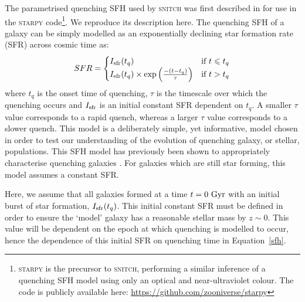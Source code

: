 \documentclass[useAMS,usenatbib]{mn2e}
\begin{document}
The parametrised quenching SFH used by \textsc{snitch} was first described in \cite{smethurst15} for use in the \textsc{starpy} code\footnote{\textsc{starpy} is the precursor to \textsc{snitch}, performing a similar inference of a quenching SFH model using only an optical and near-ultraviolet colour. The code is publicly available here: \url{https://github.com/zooniverse/starpy}}. We reproduce its description here. The quenching SFH of a galaxy can be simply modelled as an exponentially declining star formation rate (SFR) across cosmic time as:
\begin{equation}\label{sfh}
SFR =
\begin{cases}
I_{\rm{sfr}}(t_q) & \text{if } t \leq t_q \\
I_{\rm{sfr}}(t_q) \times \exp{\left( \frac{-(t-t_{q})}{\tau}\right)} & \text{if } t > t_q 
\end{cases}
\end{equation}
where $t_{q}$ is the onset time of quenching, $\tau$ is the timescale over which the quenching occurs and $I_{\rm{sfr}}$ is an initial constant SFR dependent on $t_q$.  A smaller $\tau$ value corresponds to a rapid quench, whereas a larger $\tau$ value corresponds to a slower quench. This model is a deliberately simple, yet informative, model chosen in order to test our understanding of the evolution of quenching galaxy, or stellar, populations. This SFH model has previously been shown to appropriately characterise quenching galaxies \citep{weiner06, martin07, noeske07,schawinski14, smethurst15}. For galaxies which are still star forming, this model assumes a constant SFR.



Here, we assume that all galaxies formed at a time $t=0~\rm{Gyr}$ with an initial burst of star formation, $I_{\rm{sfr}}(t_q)$. This initial constant SFR must be defined in order to ensure the `model' galaxy  has a reasonable stellar mass by $z\sim0$. This value will be dependent on the epoch at which quenching is modelled to occur, hence the dependence of this initial SFR on quenching time in Equation~\ref{sfh}. 
\end{document}
